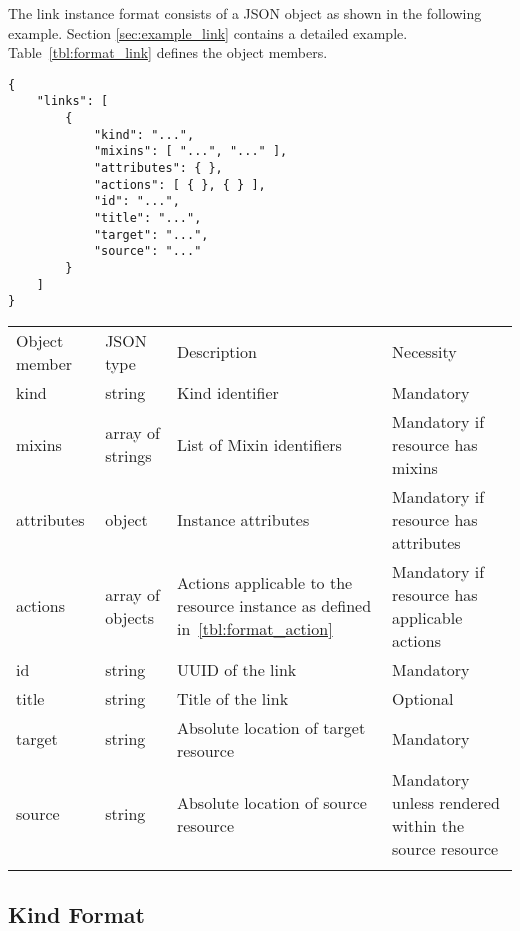 \documentclass[10pt,a4paper]{article}
\begin{document}
The link instance format consists of a JSON object as shown in the
following example. Section \ref{sec:example_link} contains a detailed example.
Table~\ref{tbl:format_link} defines the object members.
\begin{verbatim}
{
    "links": [
        {
            "kind": "...",
            "mixins": [ "...", "..." ],
            "attributes": { },
            "actions": [ { }, { } ],
            "id": "...",
            "title": "...",
            "target": "...",
            "source": "..."
        }
    ]
}
\end{verbatim}
 {
    \begin{tabular}{llp{5.0cm}p{3.0cm}}
    \toprule
    Object member & JSON type & Description & Necessity \\
    \colrule
    kind & string & Kind identifier & Mandatory \\

    mixins & array of strings & List of Mixin identifiers &
    Mandatory if resource has mixins \\

    attributes & object & Instance attributes & Mandatory if resource has attributes \\

    actions & array of objects & Actions applicable to the resource instance as defined in~\ref{tbl:format_action} &
    Mandatory if resource has applicable actions \\
    
    id & string & UUID of the link & Mandatory\\
        
    title & string & Title of the link & Optional\\
        
    target & string & Absolute location of target resource & Mandatory \\
    
    source & string & Absolute location of source resource & Mandatory unless rendered within the source resource\\
    \botrule
    \end{tabular}
}

\subsection{Kind Format}
\label{sec:format_kind}
\end{document}
